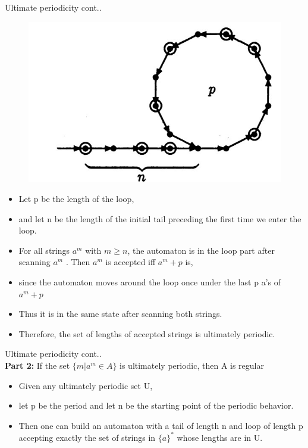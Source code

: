 \documentclass{beamer}
\begin{document}
\begin{frame}{Ultimate periodicity}
	\proofname cont..
	\begin{figure}
		\includegraphics[scale=.3]{img2/m11}
	\end{figure}
\small
\begin{itemize}
	\item Let p be the 
	length of the loop,
	\item  and let n be the length of the initial tail preceding the 
	first time we enter the loop.
	\item For all strings $a^m$ with $m \geq n$, the automaton 
	is in the loop part after scanning $a^m$ . Then $a^m$ is accepted iff $a^m +p$ is,
	\item since the automaton moves around the loop once under the last p a's of $a^m +p$ 
	\item Thus it is in the same state after scanning both strings.
	\item  Therefore, the set of lengths of accepted strings is ultimately periodic. 
\end{itemize}
\end{frame}
\begin{frame}{Ultimate periodicity}
	\proofname cont..\\
	\textbf{Part 2:} If the set $\{m | a^m \in A\}$ is ultimately periodic, then A is regular
	\begin{itemize}
		\item Given any ultimately periodic set U, 
		\item let p be the period and let n be the starting point of the periodic behavior. 
		\item Then one can build an automaton with a tail of length n and loop of length p accepting exactly the set of strings in $\{a\}^*$ whose lengths are in U.
	\end{itemize}
\end{frame}
\end{document}
